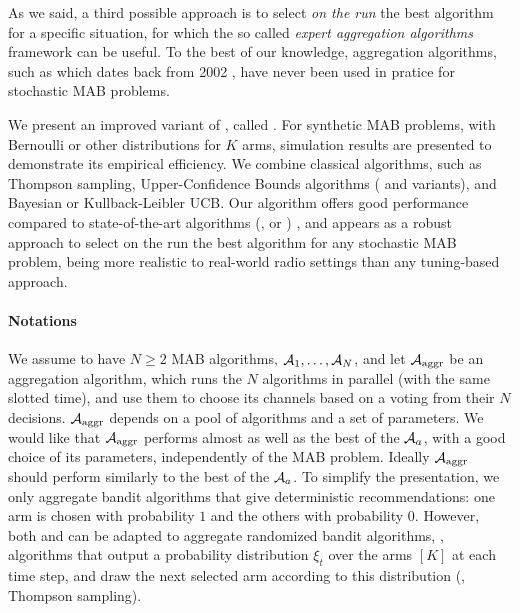 
As we said, a third possible approach is to select \emph{on the run} the best algorithm for a specific situation, for which the so called \emph{expert aggregation algorithms} framework can be useful.
%
To the best of our knowledge, aggregation algorithms, such as \ExpQ{} which dates back from 2002 \cite{Auer02},
have never been used in pratice for stochastic MAB problems.

We present an improved variant of \ExpQ, called \Aggr.
For synthetic MAB problems, with Bernoulli or other distributions for $K$ arms, simulation results are presented to demonstrate its empirical efficiency.
We combine classical algorithms, such as Thompson sampling, Upper-Confidence Bounds algorithms (\UCB{} and variants), and Bayesian or Kullback-Leibler UCB.
%
Our algorithm offers good performance compared to state-of-the-art algorithms
(\ExpQ{}, \CORRAL{} or \LearnExp{}) \cite{Agarwal16,Singla17},
and appears as a robust approach to select on the run the best algorithm for any stochastic MAB problem, being more realistic to real-world radio settings than any tuning-based approach.



\paragraph{Notations}\label{sub:25:aggregation}

We assume to have $N \geq 2$ MAB algorithms, $\mathcal{A}_1, \dots, \mathcal{A}_N$,
and let $\mathcal{A}_{\mathrm{aggr}}$ be an aggregation algorithm,
which runs the $N$ algorithms in parallel (with the same slotted time), and use them to choose its channels based on a voting from their $N$ decisions.
%
$\mathcal{A}_{\mathrm{aggr}}$ depends on a pool of algorithms and a set of parameters.
We would like that $\mathcal{A}_{\mathrm{aggr}}$
performs almost as well as the best of the $\mathcal{A}_a$, with a good choice of its parameters, independently of the MAB problem.
Ideally $\mathcal{A}_{\mathrm{aggr}}$ should perform similarly to the best of the $\mathcal{A}_a$.
%
To simplify the presentation, we only aggregate bandit algorithms that give deterministic recommendations:
one arm is chosen with probability $1$ and the others with probability $0$.
However, both \ExpQ{} and \Aggr{} can be adapted to aggregate randomized bandit algorithms, \ie, algorithms that output a probability distribution $\xi_t$ over the arms $[K]$ at each time step, and draw the next selected arm according to this distribution
(\eg, Thompson sampling).


